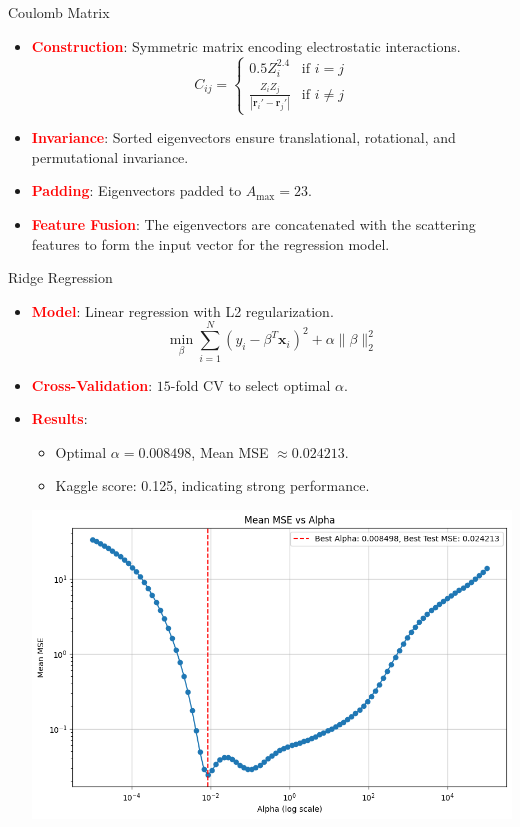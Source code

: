 \documentclass[10pt]{beamer}
\begin{document}
\begin{frame}{Coulomb Matrix}
  \begin{itemize}
    \item \textcolor{red}{\textbf{Construction}}: Symmetric matrix encoding electrostatic interactions.
      \vspace{0.2cm}
      \[
      C_{ij} =
      \begin{cases}
        0.5 Z_i^{2.4} & \text{if } i = j \\
        \frac{Z_i Z_j}{|\mathbf{r}_i' - \mathbf{r}_j'|} & \text{if } i \neq j
      \end{cases}
      \]
      \vspace{0.2cm}
        \item \textcolor{red}{\textbf{Invariance}}: Sorted eigenvectors ensure translational, rotational, and permutational invariance.
      \vspace{0.2cm}
        \item \textcolor{red}{\textbf{Padding}}: Eigenvectors padded to \( A_{\text{max}} = 23 \).
      \vspace{0.2cm}
        \item \textcolor{red}{\textbf{Feature Fusion}}: The eigenvectors are concatenated with the scattering features to form the input vector for the regression model.
  \end{itemize}
\end{frame}

\begin{frame}{Ridge Regression}
  \begin{itemize}
    \item \textcolor{red}{\textbf{Model}}: Linear regression with L2 regularization.
      {\small
      \[
      \min_{\beta} \sum_{i=1}^N \left( y_i - \beta^T \mathbf{x}_i \right)^2 + \alpha \|\beta\|_2^2
      \]
      }
    \item \textcolor{red}{\textbf{Cross-Validation}}: \( 15 \)-fold CV to select optimal \( \alpha \).
    \item \textcolor{red}{\textbf{Results}}:
      \begin{itemize}
        \item Optimal \( \alpha = 0.008498 \), Mean MSE \( \approx 0.024213 \).
        \item Kaggle score: 0.125, indicating strong performance.
      \end{itemize}
      \begin{center}
        \includegraphics[width=0.55\linewidth]{Images_Ayoub/Training/Scattering/CV/Losses/Loss.png}
      \end{center}
  \end{itemize}
\end{frame}
\end{document}
